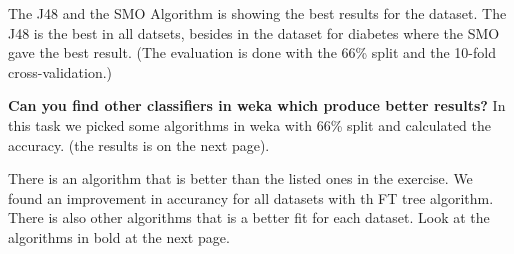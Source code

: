 			The J48 and the SMO Algorithm is showing the best results for the dataset. The 
			J48 is the best in all datsets, besides in the dataset for diabetes where the SMO
			gave the best result. 
			(The evaluation is done with the 66\% split and the 10-fold cross-validation.)

		{\bf Can you find other classifiers in weka which produce better results?}
			In this task we picked some algorithms in weka with 66\% split and calculated the accuracy. 
			(the results is on the next page).

			There is an algorithm that is better than the listed ones in the exercise. We found an improvement
			in accurancy for all datasets with th FT tree algorithm. There is also other algorithms that 
			is a better fit for each dataset. Look at the algorithms in bold at the next page. 

